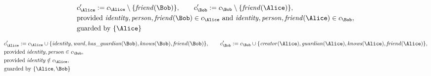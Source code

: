 \begin{align*}
&
c'_
{
\Alice
}
 := 
c_
{
\Alice
}
 \setminus 
\{
\mathit{\detokenize{
friend
}}
(
\Bob
)
\}
, \qquad 
c'_
{
\Bob
}
 := 
c_
{
\Bob
}
 \setminus 
\{
\mathit{\detokenize{
friend
}}
(
\Alice
)
\}
,\\
&
\text{provided } 
\mathit{\detokenize{
identity
}}
,
\mathit{\detokenize{
person
}}
,
\mathit{\detokenize{
friend
}}
(
\Bob
)
 \in c_
{
\Alice
}
 \text{ and } 
\mathit{\detokenize{
identity
}}
,
\mathit{\detokenize{
person
}}
,
\mathit{\detokenize{
friend
}}
(
\Alice
)
 \in c_
{
\Bob
}
,\\
&
\text{guarded by } \{
\Alice
\}
\end{align*}

\begin{align*}
&
c'_
{
\Alice
}
 := 
c_
{
\Alice
}
 \cup 
\{
\mathit{\detokenize{
identity
}}
,
\mathit{\detokenize{
ward
}}
,
\mathit{\detokenize{
has_guardian
}}
(
\Bob
)
,
\mathit{\detokenize{
knows
}}
(
\Bob
)
,
\mathit{\detokenize{
friend
}}
(
\Bob
)
\}
, \qquad 
c'_
{
\Bob
}
 := 
c_
{
\Bob
}
 \cup 
\{
\mathit{\detokenize{
creator
}}
(
\Alice
)
,
\mathit{\detokenize{
guardian
}}
(
\Alice
)
,
\mathit{\detokenize{
knows
}}
(
\Alice
)
,
\mathit{\detokenize{
friend
}}
(
\Alice
)
\}
,\\
&
\text{provided } 
\mathit{\detokenize{
identity
}}
,
\mathit{\detokenize{
person
}}
 \in c_
{
\Bob
}
,\\
&
\text{provided } 
\mathit{\detokenize{
identity
}}
 \notin c_
{
\Alice
}
,\\
&
\text{guarded by } \{
\Alice
,
\Bob
\}
\end{align*}

